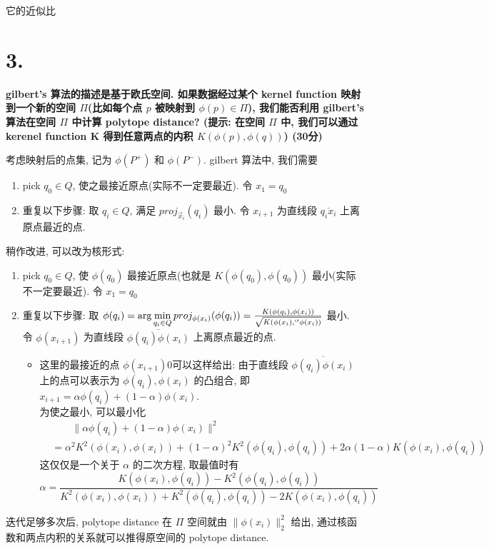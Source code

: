 \documentclass[UTF8]{article}
\newcommand{\jumpLine} {\hspace*{\fill} \par}
\begin{document}
它的近似比

\section*{3.}

\noindent \textbf{gilbert's 算法的描述是基于欧氏空间. 如果数据经过某个 kernel function 映射到一个新的空间 $\Pi$(比如每个点 $p$ 被映射到 $\phi(p)\in\Pi$), 我们能否利用 gilbert's 算法在空间 $\Pi$ 中计算 polytope distance? (提示: 在空间 $\Pi$ 中, 我们可以通过 kerenel function K 得到任意两点的内积 $K(\phi(p), \phi(q))$) (30分)} \\\jumpLine\noindent
考虑映射后的点集, 记为 $\phi(P^+)$ 和 $\phi(P^-)$.
gilbert 算法中, 我们需要
\begin{enumerate}
	\item pick $q_0 \in Q$, 使之最接近原点(实际不一定要最近). 令 $x_1 = q_0$
	\item 重复以下步骤: 取 $q_i \in Q$, 满足 $proj_{\vec{x}_i}(q_i)$ 最小. 令 $x_{i+1}$ 为直线段 $\overline{q_i x_i}$ 上离原点最近的点. 
\end{enumerate}
稍作改进, 可以改为核形式:
\begin{enumerate}
	\item pick $q_0 \in Q$, 使 $\phi(q_0)$ 最接近原点(也就是 $K(\phi(q_0), \phi(q_0))$ 最小(实际不一定要最近). 令 $x_1 = q_0$
	\item 重复以下步骤: 取 $\phi(q_i) =\arg\min\limits_{q_i \in Q} proj_{\phi({x}_i)}(\phi(q_i))=\frac{K(\phi(q_i), \phi(x_i))}{\sqrt{K(\phi(x_i), `'\phi(x_i))}}$ 最小.  \\
	令 $\phi(x_{i+1})$ 为直线段 $\overline{\phi(q_i) \phi(x_i)}$ 上离原点最近的点. 
	\begin{itemize}
		\item 这里的最接近的点 $\phi(x_{i+1})0$可以这样给出: 由于直线段 $\overline{\phi(q_i) \phi(x_i)}$ 上的点可以表示为 $\phi(q_i), \phi(x_i)$ 的凸组合, 即 $x_{i+1}=\alpha\phi(q_i) + (1-\alpha) \phi(x_i)$. \\
		为使之最小, 可以最小化
		\begin{align*}
			&\qquad\|\alpha\phi(q_i) + (1-\alpha) \phi(x_i)\|^2 \\
			&=\alpha^2 K^2(\phi(x_i), \phi(x_i)) + (1-\alpha)^2 K^2(\phi(q_i), \phi(q_i)) + 2\alpha(1-\alpha)K(\phi(x_i), \phi(q_i))
		\end{align*}
		这仅仅是一个关于 $\alpha$ 的二次方程, 取最值时有
		$$\alpha=\frac{K(\phi(x_i), \phi(q_i)) - K^2(\phi(q_i), \phi(q_i))}{K^2(\phi(x_i), \phi(x_i)) + K^2(\phi(q_i), \phi(q_i)) - 2K(\phi(x_i), \phi(q_i))}$$
	\end{itemize}
\end{enumerate}
迭代足够多次后, polytope distance 在 $\Pi$ 空间就由 $\|\phi(x_i)\|_2^2$ 给出, 通过核函数和两点内积的关系就可以推得原空间的 polytope distance.
\end{document}

